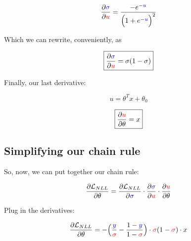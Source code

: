         \begin{equation}
            \frac{\partial  \textcolor{blue}{\sigma} }{\partial \textcolor{red}{u}}
            =
            \frac{ -e^{ -\textcolor{blue}{u} } }{ \Big(   1+e^{ -\textcolor{blue}{u} }   \Big)^2 }
        \end{equation}
        
        Which we can rewrite, conveniently, as
        
        \begin{equation}
        \boxed{
            \frac{\partial  \textcolor{blue}{\sigma} }{\partial \textcolor{red}{u}}
            =
            \sigma (1-\sigma)
        }
        \end{equation}

        \subsecdiv
        
        Finally, our last derivative:
        
        \begin{equation}
            u = \theta^Tx+\theta_0
        \end{equation}
        
        \begin{equation}
        \boxed{
            \frac{\partial \textcolor{red}{u}}{\partial \theta} = x
        }
        \end{equation}
        
    \subsection{Simplifying our chain rule}
    
        So, now, we can put together our chain rule:
        
        \begin{equation}
            \frac{\partial  \mathcal{L}_{NLL} }{\partial  \theta } 
            = 
            \frac{\partial  \mathcal{L}_{NLL} }{\partial  \textcolor{blue}{\sigma} } 
            \cdot 
            \frac{\partial  \textcolor{blue}{\sigma} }{\partial \textcolor{red}{u}} 
            \cdot 
            \frac{\partial \textcolor{red}{u}}{\partial \theta}
        \end{equation}
        
        Plug in the derivatives:
        
        \begin{equation}
            \frac{\partial  \mathcal{L}_{NLL} }{\partial  \theta } 
            = 
            -
            \Big(
                \frac{ \textcolor{blue}{y} } { \textcolor{red}{\sigma} } 
                -
                \frac{ 1-\textcolor{blue}{y} } { 1 - \textcolor{red}{\sigma} }
            \Big)
            \cdot
            \textcolor{red}{\sigma} (1-\textcolor{red}{\sigma})
            \cdot 
            x
        \end{equation}
        
